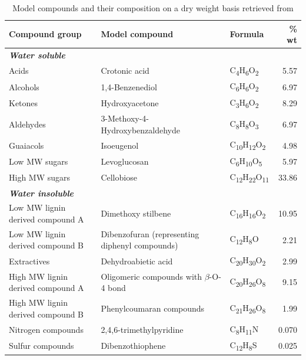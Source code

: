 \documentclass[11pt]{article}
\begin{document}
\begin{table}[htbp]
\centering
\caption{Model compounds and their composition on a dry weight basis retrieved from \cite{jones2013process}}
\begin{tabular}{|p{4.5cm}|p{4.5cm}|l|r|}
\hline
\textbf{Compound group} & \textbf{Model compound} & \textbf{Formula} & \textbf{\% wt} \\
\hline
\multicolumn{4}{|l|}{\textbf{\textit{Water soluble}}} \\
\hline
Acids & Crotonic acid & C\textsubscript{4}H\textsubscript{6}O\textsubscript{2} & 5.57 \\
\hline
Alcohols & 1,4-Benzenediol & C\textsubscript{6}H\textsubscript{6}O\textsubscript{2} & 6.97 \\
\hline
Ketones & Hydroxyacetone & C\textsubscript{3}H\textsubscript{6}O\textsubscript{2} & 8.29 \\
\hline
Aldehydes & 3-Methoxy-4-Hydroxybenzaldehyde & C\textsubscript{8}H\textsubscript{8}O\textsubscript{3} & 6.97 \\
\hline
Guaiacols & Isoeugenol & C\textsubscript{10}H\textsubscript{12}O\textsubscript{2} & 4.98 \\
\hline
Low MW sugars & Levoglucosan & C\textsubscript{6}H\textsubscript{10}O\textsubscript{5} & 5.97 \\
\hline
High MW sugars & Cellobiose & C\textsubscript{12}H\textsubscript{22}O\textsubscript{11} & 33.86 \\
\hline
\multicolumn{4}{|l|}{\textbf{\textit{Water insoluble}}} \\
\hline
Low MW lignin derived compound A & Dimethoxy stilbene & C\textsubscript{16}H\textsubscript{16}O\textsubscript{2} & 10.95 \\
\hline
Low MW lignin derived compound B & Dibenzofuran (representing diphenyl compounds) & C\textsubscript{12}H\textsubscript{8}O & 2.21 \\
\hline
Extractives & Dehydroabietic acid & C\textsubscript{20}H\textsubscript{30}O\textsubscript{2} & 2.99 \\
\hline
High MW lignin derived compound A & Oligomeric compounds with $\beta$-O-4 bond & C\textsubscript{20}H\textsubscript{26}O\textsubscript{8} & 9.15 \\
\hline
High MW lignin derived compound B & Phenylcoumaran compounds & C\textsubscript{21}H\textsubscript{26}O\textsubscript{8} & 1.99 \\
\hline
Nitrogen compounds & 2,4,6-trimethylpyridine & C\textsubscript{8}H\textsubscript{11}N & 0.070 \\
\hline
Sulfur compounds & Dibenzothiophene & C\textsubscript{12}H\textsubscript{8}S & 0.025 \\
\hline
\end{tabular}
\label{tab:model-compounds}
\end{table}
\end{document}
